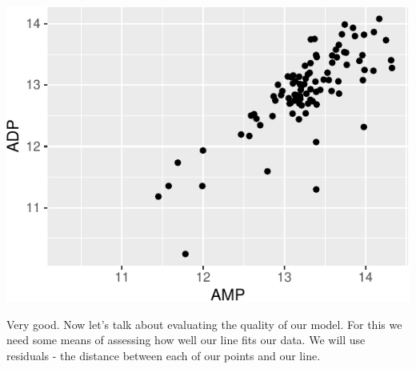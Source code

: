 \documentclass[
]{krantz}
\newenvironment{Shaded}{\begin{snugshade}}{\end{snugshade}}
\newcommand{\AttributeTok}[1]{\textcolor[rgb]{0.77,0.63,0.00}{#1}}
\newcommand{\FunctionTok}[1]{\textcolor[rgb]{0.00,0.00,0.00}{#1}}
\newcommand{\NormalTok}[1]{#1}
\newcommand{\SpecialCharTok}[1]{\textcolor[rgb]{0.00,0.00,0.00}{#1}}
\begin{document}
\begin{center}\includegraphics{index_files/figure-latex/unnamed-chunk-122-1} \end{center}

Very good. Now let's talk about evaluating the quality of our model. For this we need some means of assessing how well our line fits our data. We will use residuals - the distance between each of our points and our line.

\begin{Shaded}
\end{Shaded}
\end{document}
